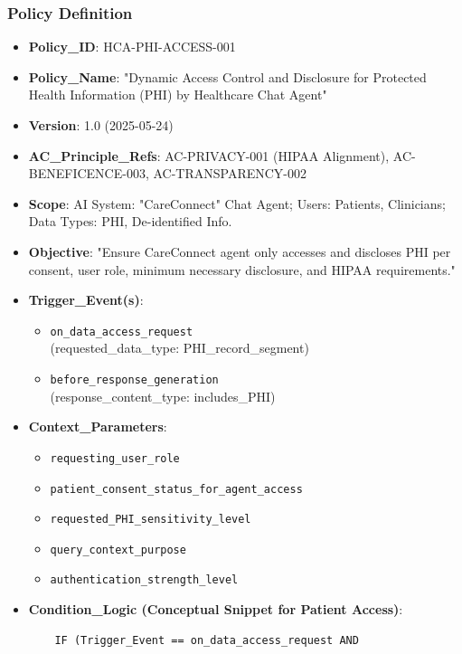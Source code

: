 \documentclass[sigconf,review,anonymous=false]{acmart} %
\begin{document}
\subsubsection{Policy Definition}
\begin{itemize}
    \item \textbf{Policy\_ID}: HCA-PHI-ACCESS-001
    \item \textbf{Policy\_Name}: "Dynamic Access Control and Disclosure for Protected Health Information (PHI) by Healthcare Chat Agent"
    \item \textbf{Version}: 1.0 (2025-05-24)
    \item \textbf{AC\_Principle\_Refs}: AC-PRIVACY-001 (HIPAA Alignment), AC-BENEFICENCE-003, AC-TRANSPARENCY-002
    \item \textbf{Scope}: AI System: "CareConnect" Chat Agent; Users: Patients, Clinicians; Data Types: PHI, De-identified Info.
    \item \textbf{Objective}: "Ensure CareConnect agent only accesses and discloses PHI per consent, user role, minimum necessary disclosure, and HIPAA requirements."
    \item \textbf{Trigger\_Event(s)}:
    \begin{itemize}
        \item \texttt{on\_data\_access\_request} \\
        (requested\_data\_type: PHI\_record\_segment)
        \item \texttt{before\_response\_generation} \\
        (response\_content\_type: includes\_PHI)
    \end{itemize}
    \item \textbf{Context\_Parameters}:
    \begin{itemize}
        \item \texttt{requesting\_user\_role}
        \item \texttt{patient\_consent\_status\_for\_agent\_access}
        \item \texttt{requested\_PHI\_sensitivity\_level}
        \item \texttt{query\_context\_purpose}
        \item \texttt{authentication\_strength\_level}
    \end{itemize}
    \item \textbf{Condition\_Logic (Conceptual Snippet for Patient Access)}:
    {\footnotesize
    \begin{verbatim}
    IF (Trigger_Event == on_data_access_request AND

\end{verbatim}}
\end{itemize}
\end{document}
